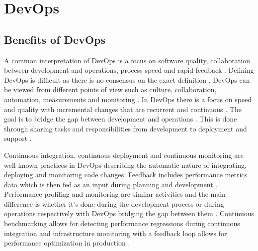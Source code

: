 \section{DevOps} %
\label{sec:devops}

\subsection{Benefits of DevOps }

A common interpretation of DevOps is a focus on software quality, collaboration between development and operations, process speed and rapid feedback \parencite{mishraDevOpsSoftwareQuality2020,wallerIncludingPerformanceBenchmarks2015, pereraImproveSoftwareQuality2017}. Defining DevOps is difficult as there is no consensus on the exact definition \parencite{smedsDevOpsDefinitionPerceived2015,mishraDevOpsSoftwareQuality2020}. DevOps can be viewed from different points of view such as culture, collaboration, automation, measurements and monitoring \parencite{mishraDevOpsSoftwareQuality2020, wallerIncludingPerformanceBenchmarks2015}. In DevOps there is a focus on speed and quality with incremental changes that are recurrent and continuous \parencite{mishraDevOpsSoftwareQuality2020}. The goal is to bridge the gap between development and operations \parencite{smedsDevOpsDefinitionPerceived2015}. This is done through sharing tasks and responsibilities from development to deployment and support \parencite{mishraDevOpsSoftwareQuality2020}.

Continuous integration, continuous deployment and continuous monitoring are well known practices in DevOps \parencite{wallerIncludingPerformanceBenchmarks2015} describing the automatic nature of integrating, deploying and monitoring code changes. Feedback includes performance metrics data which is then fed as an input during planning and development \parencite{smedsDevOpsDefinitionPerceived2015}. Performance profiling and monitoring are similar activities and the main difference is whether it's done during the development process or during operations respectively \parencite{wallerIncludingPerformanceBenchmarks2015} with DevOps bridging the gap between them \parencite{brunnertPerformanceorientedDevOpsResearch2015}. Continuous benchmarking allows for detecting performance regressions during continuous integration \parencite{wallerIncludingPerformanceBenchmarks2015} and infrastructure monitoring with a feedback loop allows for performance optimization in production \parencite{smedsDevOpsDefinitionPerceived2015}.

